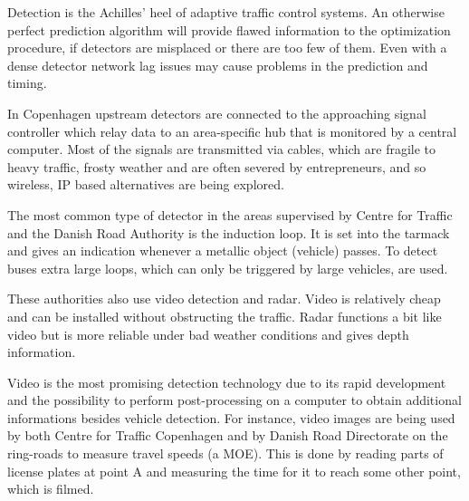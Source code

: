 \label{detection}
Detection is the Achilles' heel of adaptive traffic control systems. An otherwise perfect prediction algorithm will provide flawed information to the optimization procedure, if detectors are misplaced or there are too few of them. Even with a dense detector network lag issues may cause problems in the prediction and timing.

In Copenhagen upstream detectors are connected to the approaching signal controller which relay data to an area-specific hub that is monitored by a central computer. Most of the signals are transmitted via cables, which are fragile to heavy traffic, frosty weather and are often severed by entrepreneurs, and so wireless, IP based alternatives are being explored.

The most common type of detector in the areas supervised by Centre for Traffic and the Danish Road Authority is the induction loop. It is set into the tarmack and gives an indication whenever a metallic object (vehicle) passes. To detect buses extra large loops, which can only be triggered by large vehicles, are used. 

These authorities also use video detection and radar. Video is relatively cheap and can be installed without obstructing the traffic. Radar functions a bit like video but is more reliable under bad weather conditions and gives depth information.

Video is the most promising detection technology due to its rapid development and the possibility to perform post-processing on a computer to obtain additional informations besides vehicle detection. For instance, video images are being used by both Centre for Traffic Copenhagen and by Danish Road Directorate on the ring-roads to measure travel speeds (a MOE). This is done by reading parts of license plates at point A and measuring the time for it to reach some other point, which is filmed.